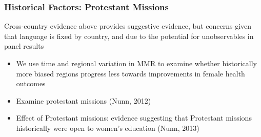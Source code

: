 \documentclass[10pt,letterpaper,subeqn]{beamer}
\begin{document}
\begin{frame}[label=MMRSub]
\frametitle{Historical Factors: Protestant Missions}
Cross-country evidence above provides suggestive evidence, but concerns given
that language is fixed by country, and due to the potential for unobservables in panel 
results
\vspace{5mm}
\begin{itemize}
\setlength{\itemsep}{10pt}
  \item We use time and regional variation in MMR to examine whether historically
        more biased regions progress less towards improvements in female health
        outcomes
  \item Examine protestant missions (Nunn, 2012)
  \item Effect of Protestant missions: evidence suggesting that 
Protestant missions historically were open to women's education (Nunn, 2013)
\end{itemize}
\end{frame}

\end{document}
